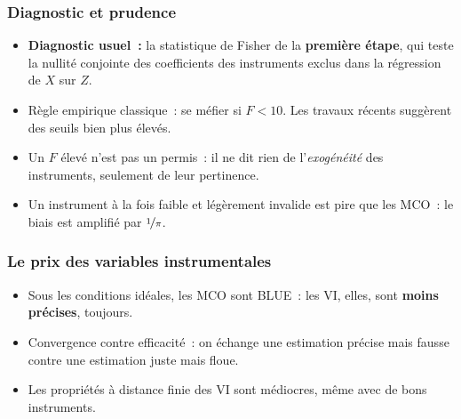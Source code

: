 \documentclass[10pt]{beamer}
\begin{document}
\begin{frame}
  \frametitle{Diagnostic et prudence}

  \begin{itemize}

  \item \textbf{Diagnostic usuel~:} la statistique de Fisher de la
    \textbf{première étape}, qui teste la nullité conjointe des coefficients des
    instruments exclus dans la régression de $X$ sur $Z$.\newline

  \item Règle empirique classique~: se méfier si $F<10$. Les travaux récents
    suggèrent des seuils bien plus élevés.\newline

  \item[\dbend] Un $F$ élevé n'est pas un permis~: il ne dit rien de
    l'\emph{exogénéité} des instruments, seulement de leur pertinence.\newline

  \item Un instrument à la fois faible et légèrement invalide est pire que les
    MCO~: le biais est amplifié par $\nicefrac{1}{\pi}$.

  \end{itemize}

\end{frame}


\begin{frame}
  \frametitle{Le prix des variables instrumentales}

  \begin{itemize}

  \item Sous les conditions idéales, les MCO sont BLUE~: les VI, elles, sont
    \textbf{moins précises}, toujours.\newline

  \item Convergence contre efficacité~: on échange une estimation précise mais
    fausse contre une estimation juste mais floue.\newline

  \item Les propriétés à distance finie des VI sont médiocres, même avec de bons
    instruments.\newline

  \end{itemize}


\end{frame}
\end{document}
